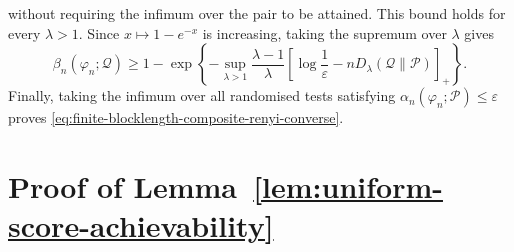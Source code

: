 \documentclass[journal,12pt,draftclsnofoot,onecolumn]{IEEEtran}
\begin{document}
\begin{IEEEproof}
\begin{equation*}
\end{equation*}
without requiring the infimum over the pair to be attained. This bound holds for every $\lambda>1$. Since $x\mapsto1-e^{-x}$ is increasing, taking the supremum over $\lambda$ gives
\begin{equation*}
\beta_n(\varphi_n;\mathcal Q) \geq 1- \exp\left\{ -\sup_{\lambda>1} \frac{\lambda-1}{\lambda} \left[\log\frac{1}{\varepsilon} - nD_\lambda(\mathcal Q\|\mathcal P) \right]_+ \right\}.
\end{equation*}
Finally, taking the infimum over all randomised tests satisfying $\alpha_n(\varphi_n;\mathcal P)\leq\varepsilon$ proves
\eqref{eq:finite-blocklength-composite-renyi-converse}.
\end{IEEEproof}

\section{Proof of Lemma~\ref{lem:uniform-score-achievability}}
\label{app:uniform-score-achievability}
\end{document}

